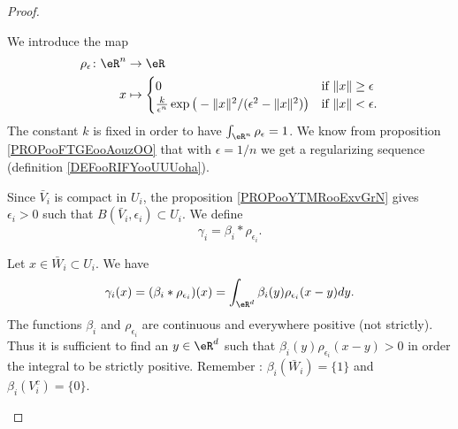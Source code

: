 \begin{proof}
\begin{subproof}
\begin{subproof}
			We introduce the map
			\begin{equation}
				\begin{aligned}
					\rho_{\epsilon}\colon \eR^n & \to \eR                                                                                                             \\
					x                           & \mapsto \begin{cases}
						                                      0                                                                         & \text{if } \| x \|\geq \epsilon \\
						                                      \frac{ k }{ \epsilon^n }\exp\big( -\| x \|^2/(\epsilon^2-\| x \|^2) \big) & \text{if } \| x \|<\epsilon.
					                                      \end{cases}
				\end{aligned}
			\end{equation}
			The constant \( k\) is fixed in order to have \( \int_{\eR^n}\rho_{\epsilon}=1\). We know from proposition \ref{PROPooFTGEooAouzOO} that with \( \epsilon=1/n\) we get a regularizing sequence (definition \ref{DEFooRIFYooUUUoha}).

			Since \( \bar V_i\) is compact in \( U_i\), the proposition \ref{PROPooYTMRooExvGrN} gives \( \epsilon_i>0\) such that \( B(\bar V_i, \epsilon_i)\subset U_i\). We define
			\begin{equation}
				\gamma_i=\beta_i*\rho_{\epsilon_i}.
			\end{equation}

					\label{SPITEMooKCNRooOYFFRU}
			Let \( x\in\bar W_i\subset U_i\). We have
			\begin{equation}
				\gamma_i(x)=(\beta_i*\rho_{\epsilon_i})(x)=\int_{\eR^d}\beta_i(y)\rho_{\epsilon_i}(x-y)dy.
			\end{equation}
			The functions \( \beta_i\) and \( \rho_{\epsilon_i}\) are continuous and everywhere positive (not strictly). Thus it is sufficient to find an \( y\in \eR^d\) such that \( \beta_i(y)\rho_{\epsilon_i}(x-y)>0\) in order the integral to be strictly positive. Remember : \( \beta_i(\bar W_i)=\{ 1 \}\) and \( \beta_i(V_i^c)=\{ 0 \}\).


\end{subproof}
\end{subproof}
\end{proof}
